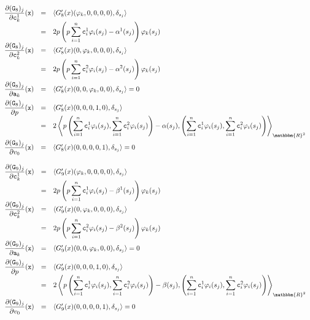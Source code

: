 \documentclass[a4paper,10pt]{book}
\newcommand{\R}{\mathbbm{R}}
\newcommand{\la}{\langle}
\newcommand{\ra}{\rangle}
\begin{document}
\[
\begin{array}{ccl}
\displaystyle\frac{\partial(\texttt{G}_8)_j}{\partial\texttt{c}^1_k}(\texttt{x})&=&\langle G'_8(x)(\varphi_k,0,0,0,0) , \delta_{s_j}\rangle\\
&=&\displaystyle2p\left(p\sum_{i=1}^n\texttt{c}^{1}_i\varphi_i(s_j)-\alpha^1(s_j)\right)\varphi_k(s_j)\\
\displaystyle\frac{\partial(\texttt{G}_8)_j}{\partial\texttt{c}^2_k}(\texttt{x})&=&\langle G'_8(x)(0,\varphi_k,0,0,0) , \delta_{s_j}\rangle\\
&=&\displaystyle2p\left(p\sum_{i=1}^n\texttt{c}^{2}_i\varphi_i(s_j)-\alpha^2(s_j)\right)\varphi_k(s_j)\\
\displaystyle\frac{\partial(\texttt{G}_8)_j}{\partial\texttt{a}_k}(\texttt{x})&=&\langle G'_8(x)(0,0,\varphi_k,0,0) , \delta_{s_j}\rangle=0\vphantom{\displaystyle\sum_{i=1}^n}\\
\displaystyle\frac{\partial(\texttt{G}_8)_j}{\partial p}(\texttt{x})&=&\langle G'_8(x)(0,0,0,1,0) , \delta_{s_j}\rangle\\
&=&\displaystyle2\left\la p\left(\sum_{i=1}^n\texttt{c}^{1}_i\varphi_i(s_j), \sum_{i=1}^n\texttt{c}^{2}_i\varphi_i(s_j)\right)-\alpha(s_j) , \left(\sum_{i=1}^n\texttt{c}^1_i\varphi_i(s_j) , \sum_{i=1}^n\texttt{c}^2_i\varphi_i(s_j)\right)\right\ra_{\R^2}\\
\displaystyle\frac{\partial(\texttt{G}_8)_j}{\partial v_0}(\texttt{x})&=&\langle G'_8(x)(0,0,0,0,1) , \delta_{s_j}\rangle=0\vphantom{\displaystyle\sum_{i=1}^n}
\end{array}
\]
\[
\begin{array}{ccl}
\displaystyle\frac{\partial(\texttt{G}_9)_j}{\partial\texttt{c}^1_k}(\texttt{x})&=&\langle G'_9(x)(\varphi_k,0,0,0,0) , \delta_{s_j}\rangle\\
&=&\displaystyle2p\left(p\sum_{i=1}^n\texttt{c}^{1}_i\varphi_i(s_j)-\beta^1(s_j)\right)\varphi_k(s_j)\\
\displaystyle\frac{\partial(\texttt{G}_9)_j}{\partial\texttt{c}^2_k}(\texttt{x})&=&\langle G'_9(x)(0,\varphi_k,0,0,0) , \delta_{s_j}\rangle\\
&=&\displaystyle2p\left(p\sum_{i=1}^n\texttt{c}^{2}_i\varphi_i(s_j)-\beta^2(s_j)\right)\varphi_k(s_j)\\
\displaystyle\frac{\partial(\texttt{G}_9)_j}{\partial\texttt{a}_k}(\texttt{x})&=&\langle G'_9(x)(0,0,\varphi_k,0,0) , \delta_{s_j}\rangle=0\vphantom{\displaystyle\sum_{i=1}^n}\\
\displaystyle\frac{\partial(\texttt{G}_9)_j}{\partial p}(\texttt{x})&=&\langle G'_9(x)(0,0,0,1,0) , \delta_{s_j}\rangle\\
&=&\displaystyle2\left\la p\left(\sum_{i=1}^n\texttt{c}^{1}_i\varphi_i(s_j), \sum_{i=1}^n\texttt{c}^{2}_i\varphi_i(s_j)\right)-\beta(s_j) , \left(\sum_{i=1}^n\texttt{c}^1_i\varphi_i(s_j) , \sum_{i=1}^n\texttt{c}^2_i\varphi_i(s_j)\right)\right\ra_{\R^2}\\
\displaystyle\frac{\partial(\texttt{G}_9)_j}{\partial v_0}(\texttt{x})&=&\langle G'_9(x)(0,0,0,0,1) , \delta_{s_j}\rangle=0\vphantom{\displaystyle\sum_{i=1}^n}\\
\end{array}
\]
\end{document}
